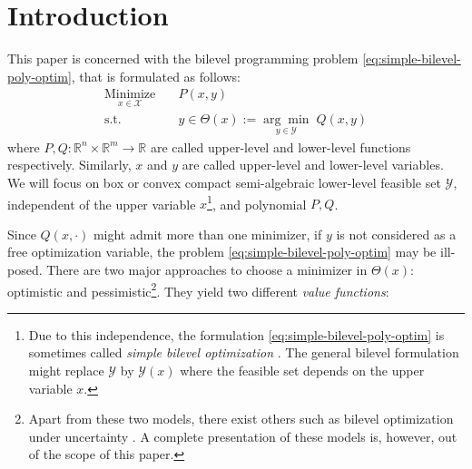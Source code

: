 \documentclass{article}
\newcommand*{\cX}{\mathcal{X}}
\newcommand*{\cY}{\mathcal{Y}}
\newcommand*{\RR}{\mathbb{R}}
\newcommand{\argmin}{\arg\min}
\newcommand{\firstvar}{x}
\newcommand{\secondvar}{y}
\theoremstyle{plain}
\theoremstyle{definition}
\begin{document}
\section{Introduction}
This paper is concerned with the bilevel programming problem \eqref{eq:simple-bilevel-poly-optim}, that is formulated as follows:
\begin{equation}
    \label{eq:simple-bilevel-poly-optim}
    \tag{BP}
    \begin{aligned}
        \underset{\firstvar \in \cX}{\text{Minimize}} & \quad P(\firstvar,\secondvar)\\
        \text{s.t.} &\quad \secondvar \in \Theta(\firstvar) :=  \underset{\secondvar \in \cY}{\argmin}\; Q(\firstvar,\secondvar)
    \end{aligned}
\end{equation}
where $P, Q: \RR^n \times \RR^m \to \RR$ are called upper-level and lower-level functions respectively. Similarly, $\firstvar$ and $\secondvar$ are called upper-level and lower-level variables. We will focus on box or convex compact semi-algebraic lower-level feasible set $\cY$, independent of the upper variable $\firstvar$\footnote{Due to this independence, the formulation \eqref{eq:simple-bilevel-poly-optim} is sometimes called \emph{simple bilevel optimization} \cite{jiawang2017bilevel,guihua2014solving}. The general bilevel formulation might replace $\cY$ by $\cY(\firstvar)$ where the feasible set depends on the upper variable $\firstvar$.}, and polynomial $P,Q$.

Since $Q(\firstvar, \cdot)$ might admit more than one minimizer, if $y$ is not considered as a free optimization variable, the problem \eqref{eq:simple-bilevel-poly-optim} may be ill-posed. There are two major approaches to choose a minimizer in $\Theta(\firstvar)$: optimistic and pessimistic\footnote{Apart from these two models, there exist others such as bilevel optimization under uncertainty \cite{beck2021robust,beck2023survey,Aboussoror1995StrongweakSP}. A complete presentation of these models is, however, out of the scope of this paper.}. They yield two different \emph{value functions}:
\end{document}
